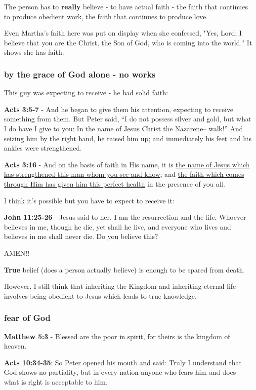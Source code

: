 \documentclass[11pt]{article}
\begin{document}
The person has to \textbf{really} believe - to have actual faith - the faith that continues to produce obedient work, the faith that continues to produce love.

Even Martha's faith here was put on display when she confessed,
"Yes, Lord; I believe that you are the Christ, the Son of God, who is coming into the world."
It shows she has faith.

\subsubsection{by the grace of God alone - no works}
\label{sec:org338ca5a}
This guy was \uline{expecting} to receive - he had solid faith:

\textbf{Acts 3:5-7} - And he began to give them his attention, expecting to receive something from them. But Peter said, “I do not possess silver and gold, but what I do have I give to you: In the name of Jesus Christ the Nazarene-- walk!” And seizing him by the right hand, he raised him up; and immediately his feet and his ankles were strengthened.

\textbf{Acts 3:16} - And on the basis of faith in His name, it is \uline{the name of Jesus which has strengthened this man whom you see and know}; and \uline{the faith which comes through Him has given him this perfect health} in the presence of you all.

I think it's possible but you have to expect to receive it:

\textbf{John 11:25-26} - Jesus said to her, I am the resurrection and the life. Whoever believes in me, though he die, yet shall he live, and everyone who lives and believes in me shall never die. Do you believe this?

AMEN!!

\textbf{True} belief (does a person actually believe) is enough to be spared from death.

However, I still think that inheriting the Kingdom and inheriting eternal life involves being obedient to Jesus which leads to true knowledge.

\subsubsection{fear of God}
\label{sec:orgdd6cb38}
\textbf{Matthew 5:3} - Blessed are the poor in spirit, for theirs is the kingdom of heaven.

\textbf{Acts 10:34-35}: So Peter opened his mouth and said: Truly I understand that God shows no partiality, but in every nation anyone who fears him and does what is right is acceptable to him.
\end{document}
